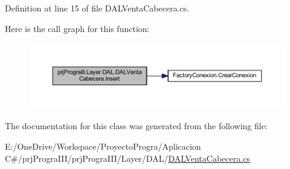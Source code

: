 Definition at line 15 of file D\+A\+L\+Venta\+Cabecera.\+cs.

Here is the call graph for this function\+:
\nopagebreak
\begin{figure}[H]
\begin{center}
\leavevmode
\includegraphics[width=350pt]{classprj_progra_i_i_i_1_1_layer_1_1_d_a_l_1_1_d_a_l_venta_cabecera_a2eecc7b4375e75276b9547217d9727cf_cgraph}
\end{center}
\end{figure}


The documentation for this class was generated from the following file\+:\begin{DoxyCompactItemize}
\item 
E\+:/\+One\+Drive/\+Workspace/\+Proyecto\+Progra/\+Aplicacion C\#/prj\+Progra\+I\+I\+I/prj\+Progra\+I\+I\+I/\+Layer/\+D\+A\+L/\hyperlink{_d_a_l_venta_cabecera_8cs}{D\+A\+L\+Venta\+Cabecera.\+cs}\end{DoxyCompactItemize}
